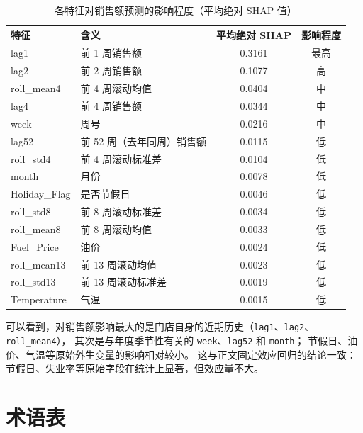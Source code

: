 \documentclass[UTF8,a4paper,11pt]{ctexart}
\begin{document}
\begin{table}[H]
\centering
\caption{各特征对销售额预测的影响程度（平均绝对 SHAP 值）}
\label{tab:shap}
\small
\begin{tabular}{llcc}
\toprule
特征 & 含义 & 平均绝对 SHAP & 影响程度 \\
\midrule
lag1 & 前 1 周销售额 & 0.3161 & 最高 \\
lag2 & 前 2 周销售额 & 0.1077 & 高 \\
roll\_mean4 & 前 4 周滚动均值 & 0.0404 & 中 \\
lag4 & 前 4 周销售额 & 0.0344 & 中 \\
week & 周号 & 0.0216 & 中 \\
lag52 & 前 52 周（去年同周）销售额 & 0.0115 & 低 \\
roll\_std4 & 前 4 周滚动标准差 & 0.0104 & 低 \\
month & 月份 & 0.0078 & 低 \\
Holiday\_Flag & 是否节假日 & 0.0046 & 低 \\
roll\_std8 & 前 8 周滚动标准差 & 0.0034 & 低 \\
roll\_mean8 & 前 8 周滚动均值 & 0.0033 & 低 \\
Fuel\_Price & 油价 & 0.0024 & 低 \\
roll\_mean13 & 前 13 周滚动均值 & 0.0023 & 低 \\
roll\_std13 & 前 13 周滚动标准差 & 0.0019 & 低 \\
Temperature & 气温 & 0.0015 & 低 \\
\bottomrule
\end{tabular}
\end{table}

\noindent
可以看到，对销售额影响最大的是门店自身的近期历史（\texttt{lag1}、\texttt{lag2}、\texttt{roll\_mean4}），
其次是与年度季节性有关的 \texttt{week}、\texttt{lag52} 和 \texttt{month}；
节假日、油价、气温等原始外生变量的影响相对较小。
这与正文固定效应回归的结论一致：节假日、失业率等原始字段在统计上显著，但效应量不大。

\section{术语表}
\end{document}
